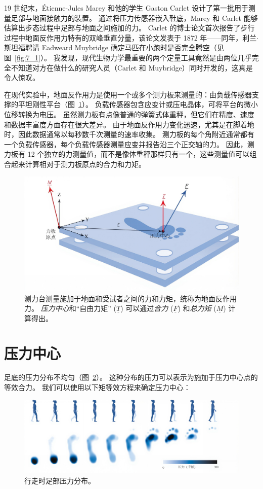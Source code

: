 19 世纪末，Étienne-Jules Marey 和他的学生 Gaston Carlet 设计了第一批用于测量足部与地面接触力的装置。
通过将压力传感器嵌入鞋底，Marey 和 Carlet 能够估算出步态过程中足部与地面之间施加的力。
Carlet 的博士论文首次报告了步行过程中地面反作用力特有的双峰垂直分量，该论文发表于 1872 年——同年，利兰$\cdot$斯坦福聘请 Eadweard Muybridge 确定马匹在小跑时是否完全腾空（见图~\ref{fig:7_1}）。
我发现，现代生物力学最重要的两个定量工具竟然是由两位几乎完全不知道对方在做什么的研究人员（Carlet 和 Muybridge）同时开发的，这真是令人惊叹。


在现代实验中，地面反作用力是使用一个或多个测力板来测量的：由负载传感器支撑的平坦刚性平台（图~\ref{fig:8_2}）。
负载传感器包含应变计或压电晶体，可将平台的微小位移转换为电压。
虽然测力板有点像普通的弹簧式体重秤，但它们在精度、速度和数据丰富度方面存在很大差异。
由于地面反作用力变化迅速，尤其是在脚着地时，因此数据通常以每秒数千次测量的速率收集。
测力板的每个角附近通常都有一个负载传感器，每个负载传感器测量应变并报告沿三个正交轴的力。
因此，测力板有 12 个独立的力测量值，而不是像体重秤那样只有一个，这些测量值可以组合起来计算相对于测力板原点的合力和力矩。


\begin{figure}[!htb]
	\centering
	\includegraphics[width=0.7\linewidth]{chap8/8_2}
	\caption{测力台测量施加于地面和受试者之间的力和力矩，统称为地面反作用力。
		\textit{压力中心}和“自由力矩” ($\underline{T}$) 可以通过\textit{合力} ($\underline{F}$) 和\textit{总力矩} ($\underline{M}$) 计算得出。 \label{fig:8_2}}
\end{figure}



\section{压力中心}

足底的压力分布不均匀（图~\ref{fig:8_3}）。
这种分布的压力可以表示为施加于压力中心点的等效合力。
我们可以使用以下矩等效方程来确定压力中心：

\begin{figure}[!htb]
	\centering
	\includegraphics[width=1.0\linewidth]{chap8/8_3}
	\caption{行走时足部压力分布\cite{pataky2012gait}。 \label{fig:8_3}}
\end{figure}

